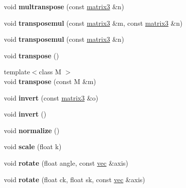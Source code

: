 \begin{DoxyCompactItemize}
\item 
\mbox{\label{structmatrix3_af2850734fc63297b3f583a224bd7ef87}} 
void {\bfseries multranspose} (const \hyperlink{structmatrix3}{matrix3} \&n)
\item 
\mbox{\label{structmatrix3_a9981ee9f9df8c61bed812bef9559f0fa}} 
void {\bfseries transposemul} (const \hyperlink{structmatrix3}{matrix3} \&m, const \hyperlink{structmatrix3}{matrix3} \&n)
\item 
\mbox{\label{structmatrix3_ace55aa434ded31ecefa54f0ffc3172b5}} 
void {\bfseries transposemul} (const \hyperlink{structmatrix3}{matrix3} \&n)
\item 
\mbox{\label{structmatrix3_accf661a3b5cbba59d81d4a1828066b45}} 
void {\bfseries transpose} ()
\item 
\mbox{\label{structmatrix3_a147f125e87cf2b0c7ffe1edac7a19801}} 
{\footnotesize template$<$class M $>$ }\\void {\bfseries transpose} (const M \&m)
\item 
\mbox{\label{structmatrix3_a58a461e313094a5350567277678e0d2c}} 
void {\bfseries invert} (const \hyperlink{structmatrix3}{matrix3} \&o)
\item 
\mbox{\label{structmatrix3_a75239d9aa6d5a9ed3d35ce8e549733a1}} 
void {\bfseries invert} ()
\item 
\mbox{\label{structmatrix3_a670ad4e8a3cda4471b9cc44d0f1442e3}} 
void {\bfseries normalize} ()
\item 
\mbox{\label{structmatrix3_a37c6fb6ef012187e7a164fb4a9c998fe}} 
void {\bfseries scale} (float k)
\item 
\mbox{\label{structmatrix3_ad2920582213c76b927e34d8c728788b0}} 
void {\bfseries rotate} (float angle, const \hyperlink{structvec}{vec} \&axis)
\item 
\mbox{\label{structmatrix3_a94706f22576bc05015a3878cf432ad68}} 
void {\bfseries rotate} (float ck, float sk, const \hyperlink{structvec}{vec} \&axis)

\end{DoxyCompactItemize}
